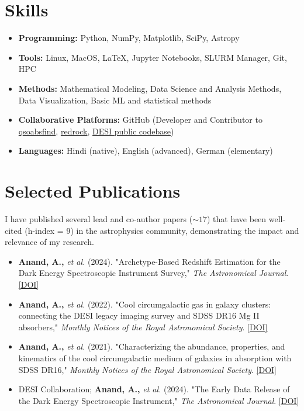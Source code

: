 \documentclass[a4paper,10pt]{article}
\begin{document}
\section*{Skills}
\begin{itemize}[noitemsep, topsep=0pt]
    \item \textbf{Programming:} Python, NumPy, Matplotlib, SciPy, Astropy
    \item \textbf{Tools:} Linux, MacOS, LaTeX, Jupyter Notebooks, SLURM Manager, Git, HPC
    \item \textbf{Methods:} Mathematical Modeling, Data Science and Analysis Methods, Data Visualization, Basic ML and statistical methods
    \item \textbf{Collaborative Platforms:} GitHub (Developer and Contributor to \href{https://github.com/abhi0395/qsoabsfind}{qsoabsfind}, \href{https://github.com/desihub/redrock}{redrock}, \href{https://github.com/desihub}{DESI public codebase})
     \item \textbf{Languages:} Hindi (native), English (advanced), German (elementary)
\end{itemize}


\section*{Selected Publications}
I have published several lead and co-author papers ($\sim 17$) that have been well-cited (h-index = 9) in the astrophysics community, demonstrating the impact and relevance of my research.
\begin{itemize}[noitemsep, topsep=0pt]
    \item \textbf{Anand, A.,} \textit{et al.} (2024). "Archetype-Based Redshift Estimation for the Dark Energy Spectroscopic Instrument Survey," \textit{The Astronomical Journal}. \href{https://iopscience.iop.org/article/10.3847/1538-3881/ad60c2}{[DOI]}
    \item \textbf{Anand, A.,} \textit{et al.} (2022). "Cool circumgalactic gas in galaxy clusters: connecting the DESI legacy imaging survey and SDSS DR16 Mg II absorbers," \textit{Monthly Notices of the Royal Astronomical Society}. \href{https://doi.org/10.1093/mnras/stab871}{[DOI]}
    \item \textbf{Anand, A.,} \textit{et al.} (2021). "Characterizing the abundance, properties, and kinematics of the cool circumgalactic medium of galaxies in absorption with SDSS DR16," \textit{Monthly Notices of the Royal Astronomical Society}. \href{https://doi.org/10.1093/mnras/stac928}{[DOI]}
    \item DESI Collaboration; \textbf{Anand, A.,} \textit{et al.} (2024). "The Early Data Release of the Dark Energy Spectroscopic Instrument," \textit{The Astronomical Journal}. \href{https://doi.org/10.3847/1538-3881/ad3217}{[DOI]}
\end{itemize}
\end{document}
